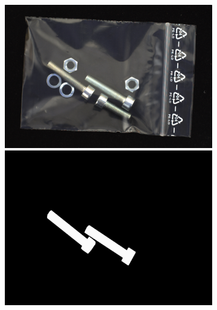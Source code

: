 \begin{figure}[H]
\begin{subfigure}[b]{0.48\textwidth}
\begin{minipage}{0.32\textwidth}
        \end{minipage}
    \end{subfigure}
    \hfill
    \begin{subfigure}[b]{0.48\textwidth}
        \centering
        \begin{minipage}{0.32\textwidth}
            \centering
            \includegraphics[width=\textwidth]{figures/DRAEMweakness/logical042image.png}
        \end{minipage}
        \begin{minipage}{0.32\textwidth}
            \centering
            \includegraphics[width=\textwidth]{figures/DRAEMweakness/logical042mask.png}
        \end{minipage}
        \begin{minipage}{0.32\textwidth}

\end{minipage}
\end{subfigure}
\end{figure}
